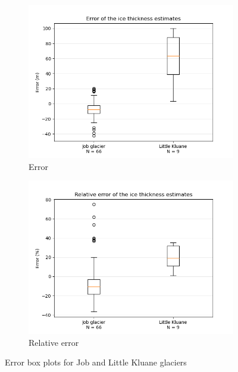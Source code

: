 \documentclass[a4, 12pt]{article}
\begin{document}
\begin{figure}[h!]
\begin{subfigure}{0.5\textwidth}
\includegraphics[width=\linewidth]{../job_kluane_maps/boxplots.png}
\caption{Error}
\label{fig:box_plot_error}
\end{subfigure}
\begin{subfigure}{0.5\textwidth}
\includegraphics[width=\linewidth]{../job_kluane_maps/rel_boxplots.png}
\caption{Relative error}
\label{fig:box_plot_rel_error}
\end{subfigure}
\caption{Error box plots for Job and Little Kluane glaciers}
\label{fig:job_lk_boxplot}
\end{figure}




\end{document}
